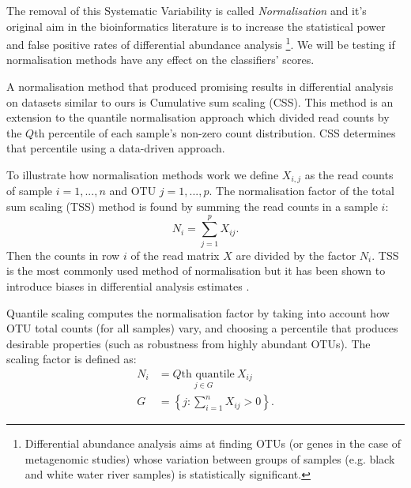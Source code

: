  The removal of this Systematic Variability is called \textit{Normalisation} and it's original aim in the bioinformatics literature is to increase the statistical power and false positive rates of differential abundance analysis \footnote{Differential abundance analysis aims at finding OTUs (or genes in the case of metagenomic studies) whose variation between groups of samples (e.g. black and white water river samples) is statistically significant.}. We will be testing if normalisation methods have any effect on the classifiers' scores.
 
 A normalisation method that produced promising results in differential analysis on datasets similar to ours is Cumulative sum scaling (CSS). This method is an extension to the quantile normalisation approach which divided read counts by the $Q$th percentile of each sample’s non-zero count distribution. CSS determines that percentile using a data-driven approach\cite{css_diff_abund}.
 
 To illustrate how normalisation methods work we define $X_{i,j}$ as the read counts of sample  $i =1,...,n$ and OTU $j=1,...,p$. The normalisation factor of the total sum scaling (TSS) method is found by summing the read counts in a sample $i$:
 \begin{equation}
 	N_i = \sum_{j=1}^{p} X_{ij}.
 \end{equation}
Then the counts in row $i$ of the read matrix $X$ are divided by the factor $N_i$. TSS is the most commonly used method of normalisation but it has been shown to introduce biases in differential analysis estimates \cite{bullard_evaluation_2010}.

Quantile scaling computes the normalisation factor by taking into account how OTU total counts (for all samples) vary, and choosing a percentile that produces desirable properties (such as robustness from highly abundant OTUs).
The scaling factor is defined as:
\begin{align}
	N_i &= \underset{ j \in G}{ Q\text{th quantile}} \  X_{ij}\\
	G  &= \left\{ j : \sum_{i = 1}^{n} X_{ij} > 0\right\}.
\end{align}

